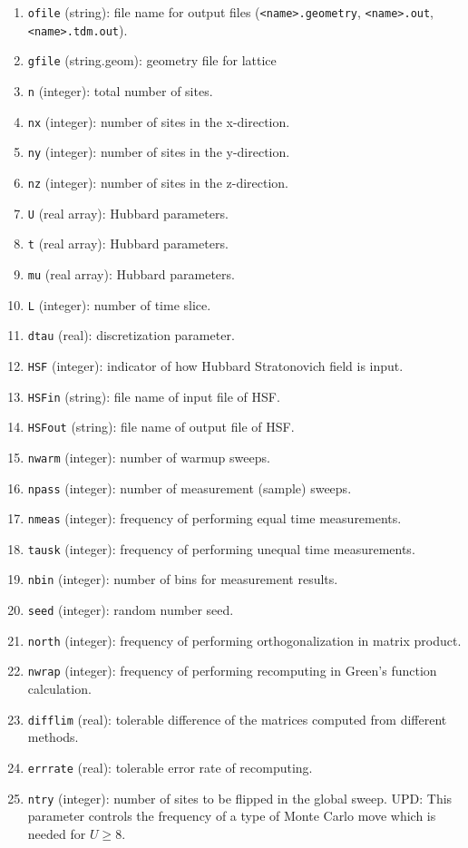 \documentclass[12pt]{article}
\begin{document}
        \begin{enumerate}
            \item \verb"ofile" (string): file name for output files (\texttt{<name>.geometry}, \texttt{<name>.out}, \texttt{<name>.tdm.out}).
            \item \verb"gfile" (string.geom): geometry file for lattice
            \item \verb"n" (integer): total number of sites.
            \item \verb"nx" (integer): number of sites in the x-direction.
            \item \verb"ny" (integer): number of sites in the y-direction.
            \item \verb"nz" (integer): number of sites in the z-direction.
            \item \verb"U" (real array): Hubbard parameters.
            \item \verb"t" (real array): Hubbard parameters.
            \item \verb"mu" (real array): Hubbard parameters.
            \item \verb"L" (integer): number of time slice.
            \item \verb"dtau" (real): discretization parameter.
            \item \verb"HSF" (integer): indicator of how Hubbard Stratonovich field is input.
            \item \verb"HSFin" (string): file name of input file of HSF.
            \item \verb"HSFout" (string): file name of output file of HSF.
            \item \verb"nwarm" (integer): number of warmup sweeps.
            \item \verb"npass" (integer): number of measurement (sample) sweeps.
            \item \verb"nmeas" (integer): frequency of performing equal time measurements.
            \item \verb"tausk" (integer): frequency of performing unequal time measurements.
            \item \verb"nbin" (integer): number of bins for measurement results.
            \item \verb"seed" (integer): random number seed.
            \item \verb"north" (integer): frequency of performing orthogonalization in matrix product.
            \item \verb"nwrap" (integer): frequency of performing recomputing in Green's function calculation.
            \item \verb"difflim" (real): tolerable difference of the matrices computed from different methods.
            \item \verb"errrate" (real): tolerable error rate of recomputing.
            \item \verb"ntry" (integer): number of sites to be flipped in the global sweep. UPD: This parameter controls the frequency of
            a type of Monte Carlo move which is needed for $U \geq 8$.
        \end{enumerate}
\end{document}
